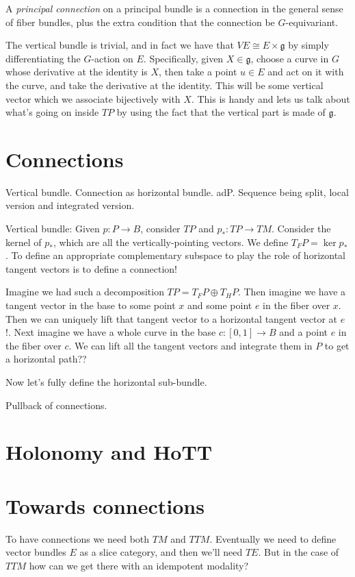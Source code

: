 \documentclass[12pt]{article}
\begin{document}
A \emph{principal connection} on a principal bundle is a connection in the general sense of fiber bundles, plus the extra condition that the connection be $G$-equivariant. 

The vertical bundle is trivial, and in fact we have that $VE\cong E\times\mathfrak{g}$ by simply differentiating the $G$-action on $E$. Specifically, given $X\in \mathfrak{g}$, choose a curve in $G$ whose derivative at the identity is $X$, then take a point $u\in E$ and act on it with the curve, and take the derivative at the identity. This will be some vertical vector which we associate bijectively with $X$. This is handy and lets us talk about what's going on inside $TP$ by using the fact that the vertical part is made of $\mathfrak{g}$.



\section{Connections}
Vertical bundle. Connection as horizontal bundle. adP. Sequence being split, local version and integrated version.

Vertical bundle: Given $p:P\to B$, consider $TP$ and $p_*:TP\to TM$. Consider the kernel of $p_*$, which are all the vertically-pointing vectors. We define $T_F P = \ker p_*$. To define an appropriate complementary subspace to play the role of horizontal tangent vectors is to define a connection! 

Imagine we had such a decomposition $TP=T_FP \oplus T_HP$. Then imagine we have a tangent vector in the base to some point $x$ and some point $e$ in the fiber over $x$. Then we can uniquely lift that tangent vector to a horizontal tangent vector at $e$!. Next imagine we have a whole curve in the base $c:[0,1]\to B$ and a point $e$ in the fiber over $c$. We can lift all the tangent vectors and integrate them in $P$ to get a horizontal path??

Now let's fully define the horizontal sub-bundle.

Pullback of connections.
\section{Holonomy and HoTT}

\section{Towards connections}
To have connections we need both $TM$ and $TTM$. Eventually we need to define vector bundles $E$ as a slice category, and then we'll need $TE$. But in the case of $TTM$ how can we get there with an idempotent modality?
\end{document}
